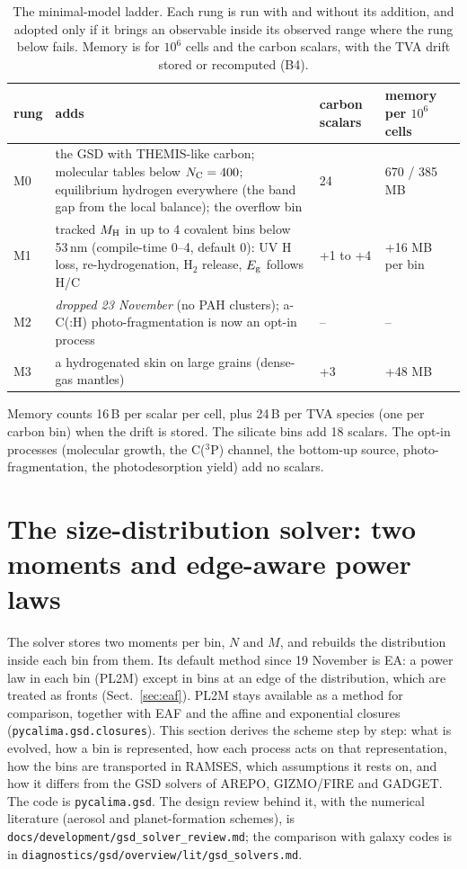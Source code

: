 \documentclass[11pt,a4paper]{article}
\newcommand{\NC}{N_{\rm C}}
\newcommand{\MH}{M_{\rm H}}
\newcommand{\Eg}{E_{\rm g}}
\begin{document}
\begin{table}[H]
\centering\small
\caption{The minimal-model ladder. Each rung is run with and without its addition, and adopted only if it brings an
observable inside its observed range where the rung below fails. Memory is for $10^6$ cells and the carbon scalars,
with the TVA drift stored or recomputed (B4).}\label{tab:ladder}
\begin{tabularx}{\textwidth}{@{}l L l l@{}}
\toprule
rung & adds & carbon scalars & memory per $10^6$ cells \\
\midrule
M0 & the GSD with THEMIS-like carbon; molecular tables below $\NC = 400$; equilibrium hydrogen everywhere (the band
  gap from the local balance); the overflow bin & 24 & 670 / 385 MB \\
M1 & tracked $\MH$ in up to 4 covalent bins below 53\,nm (compile-time 0--4, default 0): UV H loss, re-hydrogenation,
  H$_2$ release, $\Eg$ follows H/C & +1 to +4 & +16 MB per bin \\
M2 & \emph{dropped 23 November} (no PAH clusters); a-C(:H) photo-fragmentation is now an opt-in process & -- & -- \\
M3 & a hydrogenated skin on large grains (dense-gas mantles) & +3 & +48 MB \\
\bottomrule
\end{tabularx}
\end{table}
\noindent Memory counts 16\,B per scalar per cell, plus 24\,B per TVA species (one per carbon bin) when the drift is
stored. The silicate bins add 18 scalars. The opt-in processes (molecular growth, the C($^3$P) channel, the bottom-up
source, photo-fragmentation, the photodesorption yield) add no scalars.

\section{The size-distribution solver: two moments and edge-aware power laws}\label{sec:pl2m}

The solver stores two moments per bin, $N$ and $M$, and rebuilds the distribution inside each bin from them. Its
default method since 19 November is EA: a power law in each bin (PL2M) except in bins at an edge of the distribution,
which are treated as fronts (Sect.~\ref{sec:eaf}). PL2M stays available as a method for comparison, together with
EAF and the affine and exponential closures (\texttt{pycalima.gsd.closures}). This section derives the scheme step by
step: what is evolved, how a bin is represented, how each process acts on
that representation, how the bins are transported in RAMSES, which assumptions it rests on, and how it differs from the
GSD solvers of AREPO, GIZMO/FIRE and GADGET. The code is \texttt{pycalima.gsd}. The design review behind it, with the
numerical literature (aerosol and planet-formation schemes), is \texttt{docs/development/gsd\_solver\_review.md}; the
comparison with galaxy codes is in \texttt{diagnostics/gsd/overview/lit/gsd\_solvers.md}.
\end{document}
